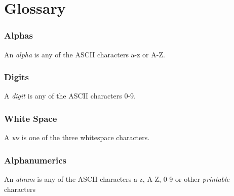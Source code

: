 \documentclass{memarticle}
\begin{document}
\section{Glossary}
		\subsubsection{Alphas}
			An \emph{alpha} is any of the ASCII characters a-z or A-Z.
		\subsubsection{Digits}
			A \emph{digit} is any of the ASCII characters 0-9.
		\subsubsection{White Space}
			A \emph{ws} is one of the three whitespace characters.
		\subsubsection{Alphanumerics}
			An \emph{alnum} is any of the ASCII characters a-z, A-Z, 0-9 or other \emph{printable} characters


\end{document}
